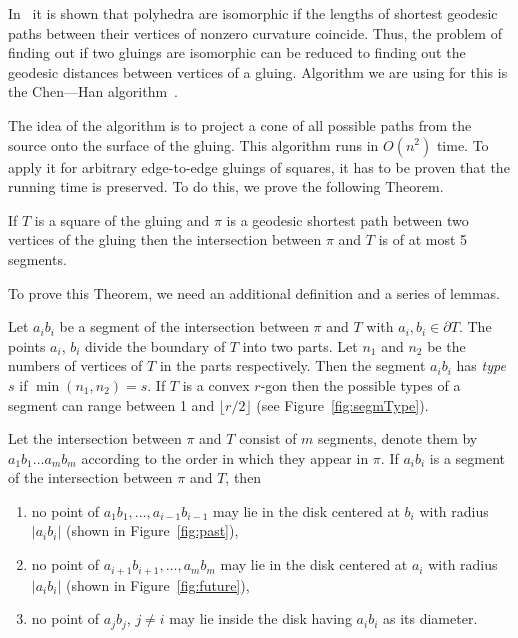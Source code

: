 \documentclass[a4paper,11pt]{article}
\begin{document}
In~\cite{DO07} it is shown that polyhedra are isomorphic if the lengths of shortest geodesic paths between their vertices of nonzero curvature coincide. Thus, the problem of finding out if two gluings are isomorphic can be reduced to finding out the geodesic distances between vertices of a gluing. Algorithm we are using for this is the Chen—Han algorithm~\cite{chen-han}.

The idea of the algorithm is to project a cone of all possible paths from the source onto the surface of the gluing. This algorithm runs in $O(n^2)$ time. To apply it for arbitrary edge-to-edge gluings of squares, it has to be proven that the running time is preserved. To do this, we prove the following Theorem.

\begin{theorem} \label{thm:shortestSquare}
	If $T$ is a square of the gluing and $\pi$ is a geodesic shortest path between two vertices of the gluing then the intersection between $\pi$ and $T$ is of at most 5 segments.
\end{theorem}

To prove this Theorem, we need an additional definition and a series of lemmas.

\begin{definition}
	Let $a_ib_i$ be a segment of the intersection between $\pi$ and $T$ with $a_i, b_i \in \partial T$. The points $a_i$, $b_i$ divide the boundary of $T$ into two parts. Let $n_1$ and $n_2$ be the numbers of vertices of $T$ in the parts respectively. Then the segment $a_ib_i$ has \emph{type $s$} if $\min (n_1, n_2) = s$. If $T$ is a convex $r$-gon then the possible types of a segment can range between 1 and $\lfloor r / 2 \rfloor$ (see Figure~\ref{fig:segmType}).
\end{definition}

\begin{figure}[h]
	
\end{figure}

\begin{lemma}
\label{lm:pastFuture}
	Let the intersection between $\pi$ and $T$ consist of $m$ segments, denote them by $a_1b_1 \ldots a_mb_m$ according to the order in which they appear in $\pi$. If $a_ib_i$ is a segment of the intersection between $\pi$ and $T$, then \begin{enumerate}
	\item \label{item:past} no point of $a_1b_1, \ldots, a_{i-1}b_{i-1}$ may lie in the disk centered at $b_i$ with radius $|a_ib_i|$ (shown in Figure~\ref{fig:past}),
	\item \label{item:future} no point of $a_{i+1}b_{i+1}, \ldots, a_mb_m$ may lie in the disk centered at $a_i$ with radius $|a_ib_i|$ (shown in Figure~\ref{fig:future}),
	\item \label{item:noother} no point of $a_jb_j$, $j \ne i$ may lie inside the disk having $a_ib_i$ as its diameter.
\end{enumerate}
\end{lemma}
\end{document}

